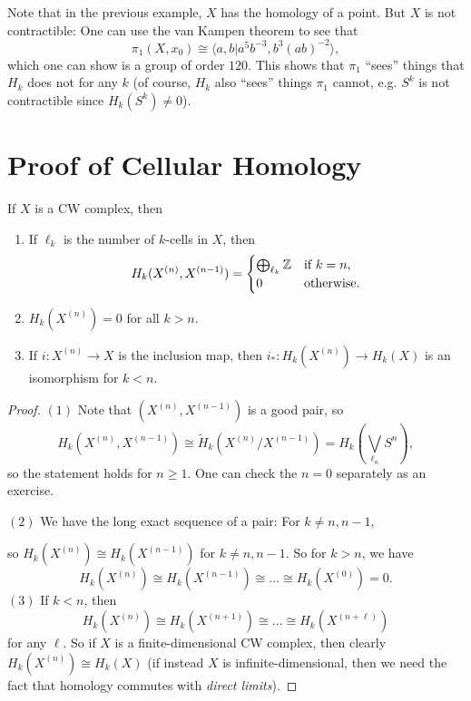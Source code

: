 \begin{remark}
  Note that in the previous example, $X$ has the
  homology of a point. But $X$ is not contractible:
  One can use the van Kampen theorem to see that
  \[
    \pi_1(X, x_0) \cong
    \langle a, b | a^5 b^{-3}, b^3 (ab)^{-2} \rangle,
  \]
  which one can show is a group of order $120$.
  This shows that $\pi_1$ ``sees'' things that
  $H_k$ does not for any $k$ (of course, $H_k$
  also ``sees'' things $\pi_1$ cannot, e.g.
  $S^k$ is not contractible since $H_k(S^k) \ne 0$).
\end{remark}

\section{Proof of Cellular Homology}

\begin{lemma}
  If $X$ is a CW complex, then
  \begin{enumerate}
    \item If $\ell_k$ is the number of $k$-cells in $X$,
      then
      \[
        H_k(X^{(n)}, X^{(n - 1)}) = \begin{cases}
          \bigoplus_{\ell_k} \mathbb{Z} & \text{if } k = n, \\
          0 & \text{otherwise}.
        \end{cases}
      \]
    \item $H_k(X^{(n)}) = 0$ for all $k > n$.
    \item If $i : X^{(n)} \to X$ is the inclusion
      map, then $i_* : H_k(X^{(n)}) \to H_k(X)$ is an isomorphism
      for $k < n$.
  \end{enumerate}
\end{lemma}

\begin{proof}
  $(1)$ Note that $(X^{(n)}, X^{(n - 1)})$ is a good
  pair, so
  \[
    H_k(X^{(n)}, X^{(n - 1)}) \cong \widetilde H_k(X^{(n)}/X^{(n - 1)}) =
    H_k\left(\bigvee_{\ell_n} S^n\right),
  \]
  so the statement holds for $n \ge 1$. One can
  check the $n = 0$ separately as an exercise.

  $(2)$ We have the long exact sequence of a
  pair: For $k \ne n, n - 1$,
  \begin{center}
  \end{center}
  so $H_k(X^{(n)}) \cong H_k(X^{(n - 1)})$ for $k \ne n, n - 1$.
  So for $k > n$, we have
  \[
    H_k(X^{(n)}) \cong H_k(X^{(n - 1)}) \cong \dots \cong H_k(X^{(0)}) = 0.
  \]
  $(3)$ If $k < n$, then
  \[
    H_k(X^{(n)}) \cong H_k(X^{(n + 1)}) \cong \dots
    \cong H_k(X^{(n + \ell)})
  \]
  for any $\ell$. So if $X$ is a finite-dimensional
  CW complex, then clearly
  $H_k(X^{(n)}) \cong H_k(X)$ (if instead $X$ is
  infinite-dimensional, then we need the fact that
  homology commutes with \emph{direct limits}).
\end{proof}

